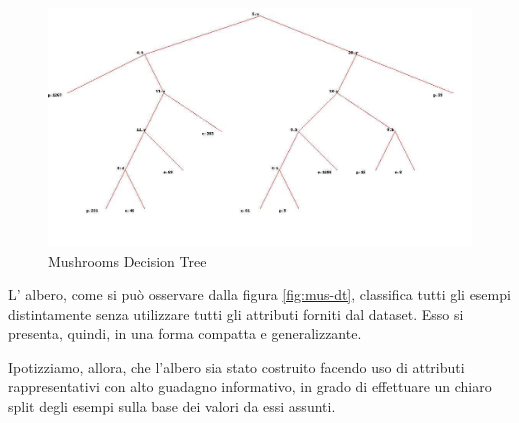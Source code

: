 			\begin{figure}
				\includegraphics[width=1.2\textwidth, height=0.9\textheight]{mushroom.jpg}
				\caption{Mushrooms Decision Tree}
				\label{fig:mus-dt}
			\end{figure}
			
					
			L' albero, come si può osservare dalla figura \vref{fig:mus-dt}, classifica tutti gli esempi distintamente senza utilizzare tutti gli attributi forniti dal dataset. Esso si presenta, quindi, in una forma compatta e generalizzante.\par
			Ipotizziamo, allora, che l'albero sia stato costruito facendo uso di attributi rappresentativi con alto guadagno informativo, in grado di effettuare un chiaro split degli esempi sulla base dei valori da essi assunti.	
